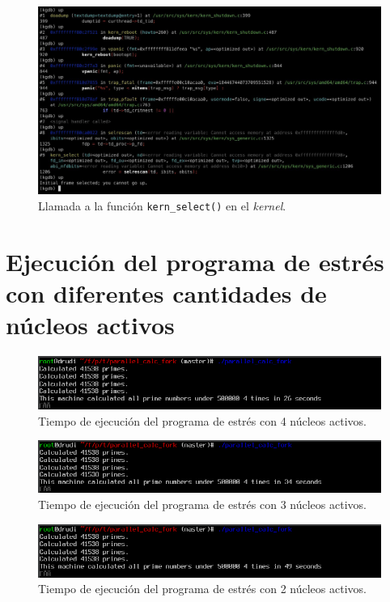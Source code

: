 \vspace{.50cm}
\begin{figure}[H]
    \centering
    \includegraphics[width=1\textwidth]{images/kgdb_kern-select.jpeg}
    \caption{Llamada a la función \texttt{kern\_select()} en el \textit{kernel}.}
    \label{fig:kgdb_kern-select}
\end{figure}

\chapter{Ejecución del programa de estrés con diferentes cantidades de núcleos activos}\label{appendix:apD}

\begin{figure}[H]
    \centering
    \includegraphics[width=1\textwidth]{images/cpuOnOff-4CPUsTime.png}
    \caption{Tiempo de ejecución del programa de estrés con 4 núcleos activos.}
    \label{fig:cpuOnOff-4CPUsTime}
\end{figure}

\begin{figure}[H]
    \centering
    \includegraphics[width=1\textwidth]{images/cpuOnOff-3CPUsTime.png}
    \caption{Tiempo de ejecución del programa de estrés con 3 núcleos activos.}
    \label{fig:cpuOnOff-3CPUsTime}
\end{figure}

\begin{figure}[H]
    \centering
    \includegraphics[width=1\textwidth]{images/cpuOnOff-2CPUsTime.png}
    \caption{Tiempo de ejecución del programa de estrés con 2 núcleos activos.}
    \label{fig:cpuOnOff-2CPUsTime}
\end{figure}

